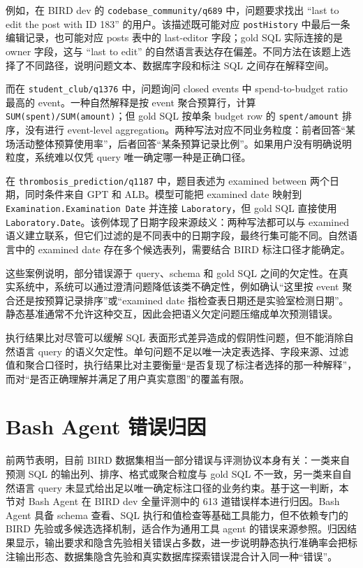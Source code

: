 \documentclass[
    bachelor,
    pdflinks,
]{xjtuthesis}
\begin{document}
例如，在 BIRD dev 的 \texttt{codebase\_community/q689} 中，问题要求找出 ``last to edit the post with ID 183'' 的用户。该描述既可能对应 \texttt{postHistory} 中最后一条编辑记录，也可能对应 posts 表中的 last-editor 字段；gold SQL 实际连接的是 owner 字段，这与 ``last to edit'' 的自然语言表达存在偏差。不同方法在该题上选择了不同路径，说明问题文本、数据库字段和标注 SQL 之间存在解释空间。

而在 \texttt{student\_club/q1376} 中，问题询问 closed events 中 spend-to-budget ratio 最高的 event。一种自然解释是按 event 聚合预算行，计算 \texttt{SUM(spent)/SUM(amount)}；但 gold SQL 按单条 budget row 的 \texttt{spent/amount} 排序，没有进行 event-level aggregation。两种写法对应不同业务粒度：前者回答“某场活动整体预算使用率”，后者回答“某条预算记录比例”。如果用户没有明确说明粒度，系统难以仅凭 query 唯一确定哪一种是正确口径。

在 \texttt{thrombosis\_prediction/q1187} 中，题目表述为 examined between 两个日期，同时条件来自 GPT 和 ALB。模型可能把 examined date 映射到 \texttt{Examination.Examination Date} 并连接 \texttt{Laboratory}，但 gold SQL 直接使用 \texttt{Laboratory.Date}。该例体现了日期字段来源歧义：两种写法都可以与 examined 语义建立联系，但它们过滤的是不同表中的日期字段，最终行集可能不同。自然语言中的 examined date 存在多个候选表列，需要结合 BIRD 标注口径才能确定。

这些案例说明，部分错误源于 query、schema 和 gold SQL 之间的欠定性。在真实系统中，系统可以通过澄清问题降低该类不确定性，例如确认“这里按 event 聚合还是按预算记录排序”或“examined date 指检查表日期还是实验室检测日期”。静态基准通常不允许这种交互，因此会把语义欠定问题压缩成单次预测错误。

执行结果比对尽管可以缓解 SQL 表面形式差异造成的假阴性问题，但不能消除自然语言 query 的语义欠定性。单句问题不足以唯一决定表选择、字段来源、过滤值和聚合口径时，执行结果比对主要衡量“是否复现了标注者选择的那一种解释”，而对“是否正确理解并满足了用户真实意图”的覆盖有限。

\section{Bash Agent 错误归因}

前两节表明，目前 BIRD 数据集相当一部分错误与评测协议本身有关：一类来自预测 SQL 的输出列、排序、格式或聚合粒度与 gold SQL 不一致，另一类来自自然语言 query 未显式给出足以唯一确定标注口径的业务约束。基于这一判断，本节对 Bash Agent 在 BIRD dev 全量评测中的 613 道错误样本进行归因。Bash Agent 具备 schema 查看、SQL 执行和值检查等基础工具能力，但不依赖专门的 BIRD 先验或多候选选择机制，适合作为通用工具 agent 的错误来源参照。归因结果显示，输出要求和隐含先验相关错误占多数，进一步说明静态执行准确率会把标注输出形态、数据集隐含先验和真实数据库探索错误混合计入同一种“错误”。
\end{document}
